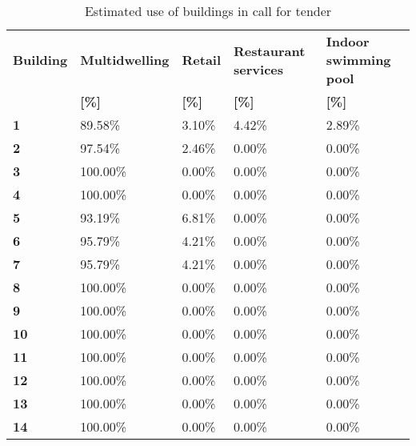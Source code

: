 \begin{table}[h!]
\centering
\caption{Estimated use of buildings in call for tender}\vspace{2mm}
\label{tab:ppa_buildinguse}
\begin{tabular}{lllll}
\toprule
\textbf{Building} & \textbf{Multidwelling} & \textbf{Retail} & \textbf{Restaurant services} & \textbf{Indoor swimming pool} \\
                  & \textbf{[\%]}               & \textbf{[\%]}      & \textbf{[\%]}          & \textbf{[\%]}              \\
                  \midrule
\textbf{1}        & 89.58\%                     & 3.10\%             & 4.42\%                 & 2.89\%                     \\
\textbf{2}        & 97.54\%                     & 2.46\%             & 0.00\%                 & 0.00\%                     \\
\textbf{3}        & 100.00\%                    & 0.00\%             & 0.00\%                 & 0.00\%                     \\
\textbf{4}        & 100.00\%                    & 0.00\%             & 0.00\%                 & 0.00\%                     \\
\textbf{5}        & 93.19\%                     & 6.81\%             & 0.00\%                 & 0.00\%                     \\
\textbf{6}        & 95.79\%                     & 4.21\%             & 0.00\%                 & 0.00\%                     \\
\textbf{7}        & 95.79\%                     & 4.21\%             & 0.00\%                 & 0.00\%                     \\
\textbf{8}        & 100.00\%                    & 0.00\%             & 0.00\%                 & 0.00\%                     \\
\textbf{9}        & 100.00\%                    & 0.00\%             & 0.00\%                 & 0.00\%                     \\
\textbf{10}       & 100.00\%                    & 0.00\%             & 0.00\%                 & 0.00\%                     \\
\textbf{11}       & 100.00\%                    & 0.00\%             & 0.00\%                 & 0.00\%                     \\
\textbf{12}       & 100.00\%                    & 0.00\%             & 0.00\%                 & 0.00\%                     \\
\textbf{13}       & 100.00\%                    & 0.00\%             & 0.00\%                 & 0.00\%                     \\
\textbf{14}       & 100.00\%                    & 0.00\%             & 0.00\%                 & 0.00\%                    \\
\bottomrule
\end{tabular}
\end{table}